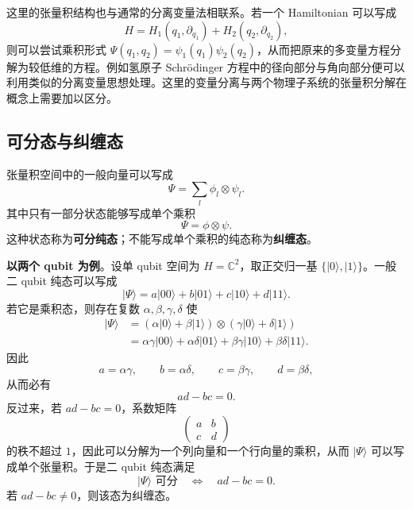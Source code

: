 \documentclass[UTF8,a4paper,11pt,openany]{ctexbook}
\begin{document}
这里的张量积结构也与通常的分离变量法相联系。若一个 Hamiltonian 可以写成
\[
H=H_1(q_1,\partial_{q_1})+H_2(q_2,\partial_{q_2}),
\]
则可以尝试乘积形式
$\Psi(q_1,q_2)=\psi_1(q_1)\psi_2(q_2)$，从而把原来的多变量方程分解为较低维的方程。例如氢原子 Schrödinger 方程中的径向部分与角向部分便可以利用类似的分离变量思想处理。这里的变量分离与两个物理子系统的张量积分解在概念上需要加以区分。

\subsection{可分态与纠缠态}

张量积空间中的一般向量可以写成
\begin{equation}
    \Psi
    =
    \sum_{l}
    \phi_l\otimes\psi_l.
\end{equation}
其中只有一部分状态能够写成单个乘积
\[
\Psi=\phi\otimes\psi.
\]
这种状态称为\textbf{可分纯态}；不能写成单个乘积的纯态称为\textbf{纠缠态}。

\textbf{以两个 qubit 为例}。设单 qubit 空间为
$H=\mathbb C^2$，取正交归一基
$\{|0\rangle,|1\rangle\}$。一般二 qubit 纯态可以写成
\begin{equation}
    |\Psi\rangle
    =
    a|00\rangle
    +
    b|01\rangle
    +
    c|10\rangle
    +
    d|11\rangle.
\end{equation}
若它是乘积态，则存在复数
$\alpha,\beta,\gamma,\delta$ 使
\begin{align}
    |\Psi\rangle
    &=
    (\alpha|0\rangle+\beta|1\rangle)
    \otimes
    (\gamma|0\rangle+\delta|1\rangle)
    \nonumber\\
    &=
    \alpha\gamma|00\rangle
    +
    \alpha\delta|01\rangle
    +
    \beta\gamma|10\rangle
    +
    \beta\delta|11\rangle.
\end{align}
因此
\[
a=\alpha\gamma,\qquad
b=\alpha\delta,\qquad
c=\beta\gamma,\qquad
d=\beta\delta,
\]
从而必有
\begin{equation}
    ad-bc=0.
\end{equation}
反过来，若
$ad-bc=0$，系数矩阵
\[
\begin{pmatrix}
a&b\\
c&d
\end{pmatrix}
\]
的秩不超过 $1$，因此可以分解为一个列向量和一个行向量的乘积，从而
$|\Psi\rangle$ 可以写成单个张量积。于是二 qubit 纯态满足
\begin{equation}
    \boxed{
    |\Psi\rangle\text{ 可分}
    \quad\Longleftrightarrow\quad
    ad-bc=0
    }.
\end{equation}
若 $ad-bc\neq0$，则该态为纠缠态。
\end{document}
